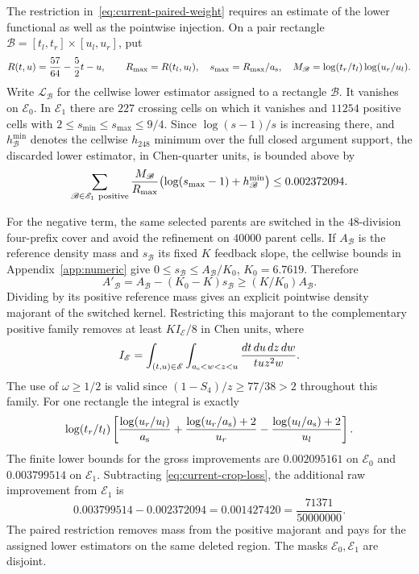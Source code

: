 The restriction in~\eqref{eq:current-paired-weight} requires an estimate
of the lower functional as well as the pointwise injection. On a pair
rectangle $\mathscr B=[t_l,t_r]\times[u_l,u_r]$, put
\[
 R(t,u)=\frac{57}{64}-\frac52t-u,\qquad
 R_{\max}=R(t_l,u_l),\quad s_{\max}=R_{\max}/{a_{\rm s}},\quad
 M_{\mathscr B}=\log(t_r/t_l)\log(u_r/u_l).
\]
Write $\mathcal L_{\mathscr B}$ for the cellwise lower estimator assigned to a
rectangle $\mathscr B$. It vanishes on $\mathscr E_0$. In $\mathscr E_1$ there are
$227$ crossing cells on which it vanishes and $11254$
positive cells with $2\le s_{\min}\le s_{\max}\le9/4$.
Since $\log(s-1)/s$ is increasing there, and $h_{\mathscr B}^{\min}$ denotes the
cellwise $h_{248}$ minimum over the full closed argument support,
the discarded lower estimator, in Chen-quarter units, is
bounded above by
\begin{equation}
 \sum_{\mathscr B\in \mathscr E_1\ {\rm positive}}
       \frac{M_{\mathscr B}}{R_{\max}}\bigl(\log(s_{\max}-1)+h_{\mathscr B}^{\min}\bigr)
       \le 0.002372094.
 \label{eq:current-crop-loss}
\end{equation}

For the negative term, the same selected parents are switched in
the $48$-division four-prefix cover and avoid the refinement on
$40000$ parent cells.
If $A_{\mathscr B}$ is the reference density mass and $s_{\mathscr B}$ its fixed $K$
feedback slope, the cellwise bounds in Appendix~\ref{app:numeric} give
$0\le s_{\mathscr B}\le A_{\mathscr B}/K_0$, $K_0=6.7619$.  Therefore
\[
 A'_{\mathscr B}=A_{\mathscr B}-(K_0-K)s_{\mathscr B}\ge(K/K_0)A_{\mathscr B}.
\]
Dividing by its positive reference mass gives an explicit
pointwise density majorant of the switched kernel.
Restricting this majorant to the complementary positive family
removes at least $KI_{\mathscr E}/8$ in Chen units, where
\begin{equation}
 I_{\mathscr E}=\int_{(t,u)\in \mathscr E}\int_{{a_{\rm s}}<w<z<u}
                      \frac{dt\,du\,dz\,dw}{tu z^2w}.
 \label{eq:current-crop-integral}
\end{equation}
The use of $\omega\ge1/2$ is valid since
$(1-S_4)/z\ge77/38>2$ throughout this family.  For one rectangle
the integral is exactly
\[
 \log(t_r/t_l)\left[
 \frac{\log(u_r/u_l)}{a_{\rm s}}+\frac{\log(u_r/{a_{\rm s}})+2}{u_r}
                         -\frac{\log(u_l/{a_{\rm s}})+2}{u_l}\right].
\]
The finite lower bounds for the gross improvements are
$0.002095161$ on $\mathscr E_0$ and $0.003799514$ on $\mathscr E_1$.
Subtracting \eqref{eq:current-crop-loss}, the additional raw
improvement from $\mathscr E_1$ is
\begin{equation}
          0.003799514-0.002372094
             =0.001427420=\frac{71371}{50000000}.
 \label{eq:current-new-crop-gain}
\end{equation}
The paired restriction removes mass from the positive majorant and
pays for the assigned lower estimators on the same deleted region.
The masks $\mathscr E_0,\mathscr E_1$ are disjoint.


